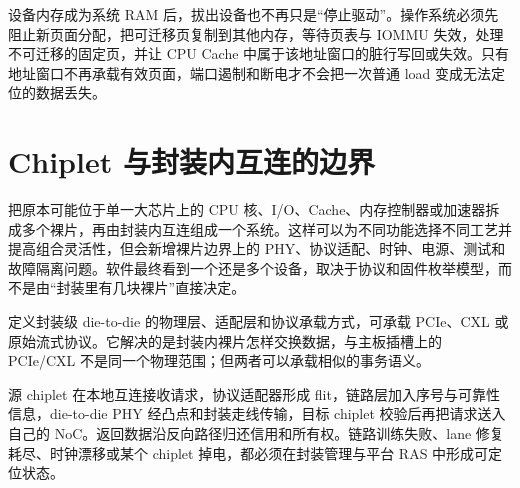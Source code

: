 设备内存成为系统 RAM 后，拔出设备也不再只是“停止驱动”。操作系统必须先阻止新页面分配，把可迁移页复制到其他内存，等待页表与 IOMMU 失效，处理不可迁移的固定页，并让 CPU Cache 中属于该地址窗口的脏行写回或失效。只有地址窗口不再承载有效页面，端口遏制和断电才不会把一次普通 load 变成无法定位的数据丢失。

\section{Chiplet 与封装内互连的边界}

 把原本可能位于单一大芯片上的 CPU 核、I/O、Cache、内存控制器或加速器拆成多个裸片，再由封装内互连组成一个系统。这样可以为不同功能选择不同工艺并提高组合灵活性，但会新增裸片边界上的 PHY、协议适配、时钟、电源、测试和故障隔离问题。软件最终看到一个还是多个设备，取决于协议和固件枚举模型，而不是由“封装里有几块裸片”直接决定。

 定义封装级 die-to-die 的物理层、适配层和协议承载方式，可承载 PCIe、CXL 或原始流式协议。它解决的是封装内裸片怎样交换数据，与主板插槽上的 PCIe/CXL 不是同一个物理范围；但两者可以承载相似的事务语义。\cite{ucie-specs}

源 chiplet 在本地互连接收请求，协议适配器形成 flit，链路层加入序号与可靠性信息，die-to-die PHY 经凸点和封装走线传输，目标 chiplet 校验后再把请求送入自己的 NoC。返回数据沿反向路径归还信用和所有权。链路训练失败、lane 修复耗尽、时钟漂移或某个 chiplet 掉电，都必须在封装管理与平台 RAS 中形成可定位状态。

